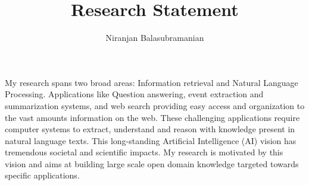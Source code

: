 \documentclass[a4paper,11pt,onecolumn]{article}
\begin{document}

\title{Research Statement}
\author{Niranjan Balasubramanian}
\maketitle

My research spans two broad areas: Information retrieval and Natural Language Processing. Applications like Question answering, event extraction and summarization systems, and web search providing easy access and organization to the vast amounts information on the web. These challenging applications require computer systems to extract, understand and reason with knowledge present in natural language texts. This long-standing Artificial Intelligence (AI) vision has tremendous societal and scientific impacts. My research is motivated by this vision and aims at building large scale open domain knowledge targeted towards specific applications.


\end{document}
